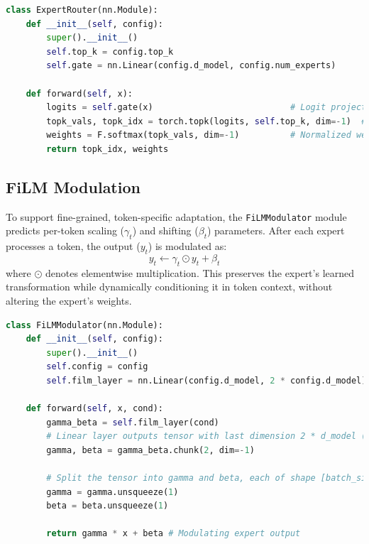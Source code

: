 \documentclass{article}
\begin{document}
\vspace{3pt}
\begin{lstlisting}[language=Python, caption={Sparse gating/routing}, label={lst:sparse_gate}]
class ExpertRouter(nn.Module):
    def __init__(self, config):
        super().__init__()
        self.top_k = config.top_k
        self.gate = nn.Linear(config.d_model, config.num_experts)

    def forward(self, x):
        logits = self.gate(x)                           # Logit projection
        topk_vals, topk_idx = torch.topk(logits, self.top_k, dim=-1)  # Sparse selection
        weights = F.softmax(topk_vals, dim=-1)          # Normalized weights
        return topk_idx, weights

\end{lstlisting}




\subsection{FiLM Modulation}
To support fine-grained, token-specific adaptation, the \texttt{FiLMModulator} module predicts per-token scaling ($\gamma_t$) and shifting ($\beta_t$) parameters. After each expert processes a token, the output (\(y_t\)) is modulated as:
\[
y_t \leftarrow \gamma_t \odot y_t + \beta_t
\]
where $\odot$ denotes elementwise multiplication. This preserves the expert’s learned transformation while dynamically conditioning it in token context, without altering the expert's weights.

\vspace{3pt}
\begin{lstlisting}[language=Python, caption=\texttt{FiLMModulator} module, label={lst:film}]
class FiLMModulator(nn.Module):
    def __init__(self, config):
        super().__init__()
        self.config = config
        self.film_layer = nn.Linear(config.d_model, 2 * config.d_model) 

    def forward(self, x, cond):
        gamma_beta = self.film_layer(cond) 
        # Linear layer outputs tensor with last dimension 2 * d_model (gamma and beta concatenated)
        gamma, beta = gamma_beta.chunk(2, dim=-1) 

        # Split the tensor into gamma and beta, each of shape [batch_size, seq_len, d_model]
        gamma = gamma.unsqueeze(1)
        beta = beta.unsqueeze(1)
        
        return gamma * x + beta # Modulating expert output
\end{lstlisting}
\end{document}
